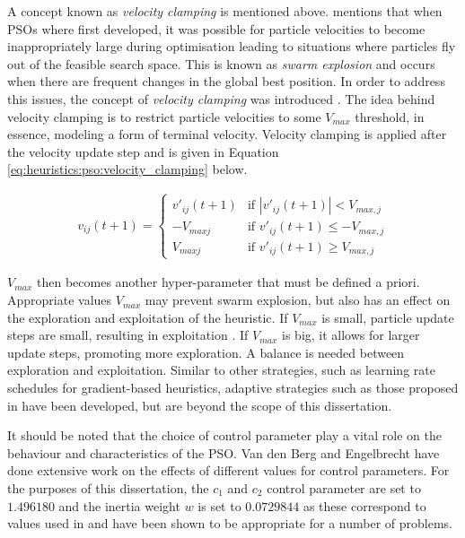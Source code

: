 A concept known as \textit{velocity clamping} is mentioned above. \citeauthor{ref:vanwyk:2014}\cite{ref:vanwyk:2014} mentions that when \acp{PSO} where first developed, it was possible for particle velocities to become inappropriately large during optimisation leading to situations where particles fly out of the feasible search space. This is known as \textit{swarm explosion} and occurs when there are frequent changes in the global best position. In order to address this issues, the concept of \textit{velocity clamping} was introduced \cite{ref:eberhart:1996}. The idea behind velocity clamping is to restrict particle velocities to some $V_{max}$ threshold, in essence, modeling a form of terminal velocity. Velocity clamping is applied after the velocity update step and is given in Equation \ref{eq:heuristics:pso:velocity_clamping} below.

\begin{equation}
      \label{eq:heuristics:pso:velocity_clamping}
      \begin{split}
            v_{ij}(t+1)=
            \begin{cases}
                  v'_{ij}(t+1) & \text{if } |v'_{ij}(t+1)| < V_{max,j}   \\
                  -V_{maxj}    & \text{if } v'_{ij}(t+1) \leq -V_{max,j} \\
                  V_{maxj}     & \text{if } v'_{ij}(t+1) \geq V_{max,j}
            \end{cases}
      \end{split}
\end{equation}

$V_{max}$ then becomes another hyper-parameter that must be defined a priori. Appropriate values $V_{max}$ may prevent swarm explosion, but also has an effect on the exploration and exploitation of the heuristic. If $V_{max}$ is small, particle update steps are small, resulting in exploitation \cite{ref:eberhart:1996}. If $V_{max}$ is big, it allows for larger update steps, promoting more exploration. A balance is needed between exploration and exploitation. Similar to other strategies, such as learning rate schedules for gradient-based heuristics, adaptive strategies such as those proposed in \cite{ref:fan:2002} have been developed, but are beyond the scope of this dissertation.

It should be noted that the choice of control parameter play a vital role on the behaviour and characteristics of the \ac{PSO}. Van den Berg and Engelbrecht \cite{ref:vandenberg:2007}\cite{ref:vandenberg:2006} have done extensive work on the effects of different values for control parameters. For the purposes of this dissertation, the $c_{1}$ and $c_{2}$ control parameter are set to $1.496180$ and the inertia weight $w$ is set to $0.0729844$ as these correspond to values used in \cite{ref:eberhart:2000} and have been shown to be appropriate for a number of problems.

